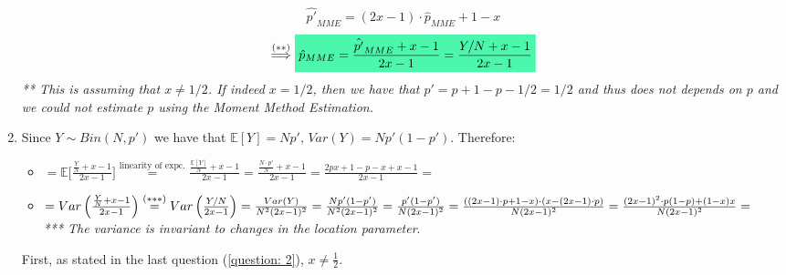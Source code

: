\documentclass[../main.tex]{subfiles}
\begin{document}
\begin{enumerate}
    $$\hat{p'}_{MME} = (2x-1)\cdot\hat{p}_{MME}+1-x$$
    $$\overset{(**)}{\Longrightarrow} \mathcolorbox{goodcolor}{\hat{p}_{MME}= \frac{\hat{p'}_{MME}+x-1}{2x-1}=\frac{Y/N+x-1}{2x-1}}$$
    \emph{** This is assuming that $x\neq 1/2$. If indeed $x = 1/2$, then we have that $p' = p +1 -p -1/2= 1/2$ and thus does not depends on $p$ and we could not estimate $p$ using the Moment Method Estimation.}
    \item \label{question: 3}Since $Y\sim Bin(N, p')$ we have that $\mathbb{E}[Y] = Np', \, Var(Y) =Np'(1-p')$. Therefore:
    \begin{itemize}
        \item {} $=\mathbb{E}\bigg[\frac{\frac{Y}{N}+x-1}{2x-1}\bigg]\overset{\text{linearity of expc.}}{=}\frac{\frac{\mathbb{E}[Y]}{N}+x-1}{2x-1}=\frac{\frac{N\cdot p'}{N}+x-1}{2x-1}=\frac{2px+1-p-x+x-1}{2x-1}=$
    \item {} $=Var\left(\frac{\frac{Y}{N}+x-1}{2x-1}\right)\overset{(***)}{=}Var\left(\frac{Y/N}{2x-1}\right)=\frac{Var(Y)}{N^2(2x-1)^2}=\frac{Np'(1-p')}{N^2(2x-1)^2}=\frac{p'(1-p')}{N(2x-1)^2}=\\ \frac{\left((2x-1)\cdot p+1-x\right)\cdot\left(x-(2x-1)\cdot p\right)}{N(2x-1)^2} = \frac{(2x-1)^2\cdot p(1-p)+(1-x)x}{N(2x-1)^2}=$ \\
        \emph{*** The variance is invariant to changes in the location parameter}.
    \end{itemize}
    First, as stated in the last question (\ref{question: 2}), $x\ne \frac{1}{2}$.\\
    

\end{enumerate}
\end{document}
